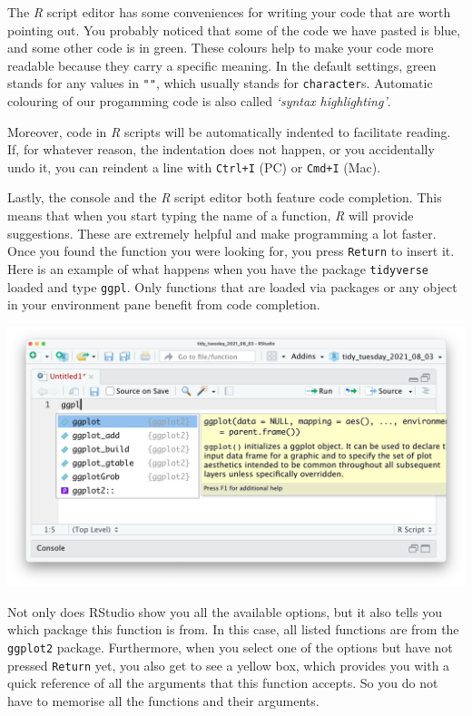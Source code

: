 \documentclass[
  letterpaper,
]{krantz}
\begin{document}
The \emph{R} script editor has some conveniences for writing your code
that are worth pointing out. You probably noticed that some of the code
we have pasted is blue, and some other code is in green. These colours
help to make your code more readable because they carry a specific
meaning. In the default settings, green stands for any values in
\texttt{""}, which usually stands for \texttt{character}s. Automatic
colouring of our progamming code is also called \emph{`syntax
highlighting'}.

Moreover, code in \emph{R} scripts will be automatically indented to
facilitate reading. If, for whatever reason, the indentation does not
happen, or you accidentally undo it, you can reindent a line with
\texttt{Ctrl+I} (PC) or \texttt{Cmd+I} (Mac).

Lastly, the console and the \emph{R} script editor both feature code
completion. This means that when you start typing the name of a
function, \emph{R} will provide suggestions. These are extremely helpful
and make programming a lot faster. Once you found the function you were
looking for, you press \texttt{Return} to insert it. Here is an example
of what happens when you have the package \texttt{tidyverse} loaded and
type \texttt{ggpl}. Only functions that are loaded via packages or any
object in your environment pane benefit from code completion.

\includegraphics{images/chapter_06_img/02_r_script/02_r_script_code_completion.png}

Not only does RStudio show you all the available options, but it also
tells you which package this function is from. In this case, all listed
functions are from the \texttt{ggplot2} package. Furthermore, when you
select one of the options but have not pressed \texttt{Return} yet, you
also get to see a yellow box, which provides you with a quick reference
of all the arguments that this function accepts. So you do not have to
memorise all the functions and their arguments.
\end{document}
